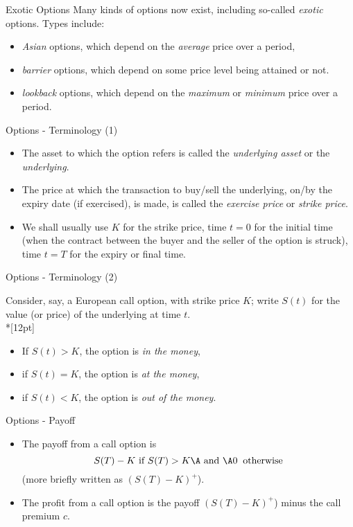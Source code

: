 {Exotic Options}
Many kinds of options now exist, including so-called {\it exotic}
options.  Types include:
\begin{itemize}
  \item<1-> {\it Asian} options, which depend on the
{\it average} price over a period,
\item<2-> {\it barrier} options, which depend on some price level being
attained or not.
\item<3-> {\it lookback} options, which
depend on the  {\it maximum} or {\it minimum} price over a period.
\end{itemize}



{Options - Terminology (1)}

\begin{itemize}
\item<1-> The asset to which the option refers is called the {\it underlying
asset} or the {\it underlying}.
\item<2->
The price at which the transaction
to buy/sell the underlying, on/by the expiry date (if exercised),
is made, is called the {\it exercise price} or {\it strike price}.
\item<3-> We shall usually use $K$ for the strike price, time $t = 0$ for
the initial time (when the contract between the buyer and the
seller of the option is struck), time $t = T$ for the expiry or
final time.
\end{itemize}





{Options - Terminology (2)}

Consider, say, a European call option, with strike price $K$;
write $S(t)$ for the value (or price) of the underlying at time
$t$.\\*[12pt]
\begin{itemize}
  \item<1-> If $S(t) > K$, the option is {\it in the money},
  \item<2-> if $S(t) = K$, the option is {\it at the money},
  \item<3-> if $S(t) < K$, the option is {\it out of the money}.
\end{itemize}



{Options - Payoff}

\begin{itemize}
  \item<1-> The payoff from a call option is $$ S(T) - K \mbox{ if } S(T)
> K\A \mbox{ and }\A 0 \;\; \mbox{otherwise} $$ (more briefly
written as  $(S(T) - K)^+$).
\item<2-> The profit from a call option is the payoff $(S(T) - K)^+$) minus the call premium $c$.
\end{itemize}



